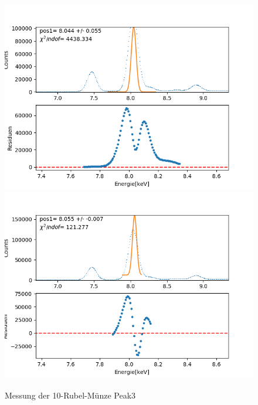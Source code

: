 \documentclass[12pt,a4paper]{article}
\begin{document}
\begin{figure}[H]
\centering
\includegraphics[scale=0.49]{Bilder/roentgen_spektren/rubel/rub4_1.png}
\includegraphics[scale=0.49]{Bilder/roentgen_spektren/rubel/rub4_2.png}
\caption{Messung der 10-Rubel-Münze Peak3}
\end{figure}
\end{document}

